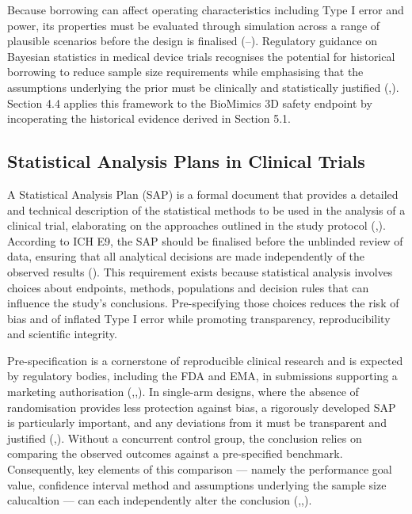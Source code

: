 \documentclass{article}
\begin{document}
Because borrowing can affect operating characteristics including Type I
error and power, its properties must be evaluated through simulation
across a range of plausible scenarios before the design is finalised
(--).
Regulatory guidance on Bayesian statistics in medical device trials
recognises the potential for historical borrowing to reduce sample size
requirements while emphasising that the assumptions underlying the prior
must be clinically and statistically justified
(,).
Section 4.4 applies this framework to the BioMimics 3D safety endpoint
by incoperating the historical evidence derived in Section 5.1.

\subsection{Statistical Analysis Plans in Clinical
Trials}\label{statistical-analysis-plans-in-clinical-trials}

A Statistical Analysis Plan (SAP) is a formal document that provides a
detailed and technical description of the statistical methods to be used
in the analysis of a clinical trial, elaborating on the approaches
outlined in the study protocol
(,).
According to ICH E9, the SAP should be finalised before the unblinded
review of data, ensuring that all analytical decisions are made
independently of the observed results
().
This requirement exists because statistical analysis involves choices
about endpoints, methods, populations and decision rules that can
influence the study's conclusions. Pre-specifying those choices reduces
the risk of bias and of inflated Type I error while promoting
transparency, reproducibility and scientific integrity.

Pre-specification is a cornerstone of reproducible clinical research and
is expected by regulatory bodies, including the FDA and EMA, in
submissions supporting a marketing authorisation
(,,).
In single-arm designs, where the absence of randomisation provides less
protection against bias, a rigorously developed SAP is particularly
important, and any deviations from it must be transparent and justified
(,).
Without a concurrent control group, the conclusion relies on comparing
the observed outcomes against a pre-specified benchmark. Consequently,
key elements of this comparison --- namely the performance goal value,
confidence interval method and assumptions underlying the sample size
calucaltion --- can each independently alter the conclusion
(,,).
\end{document}
